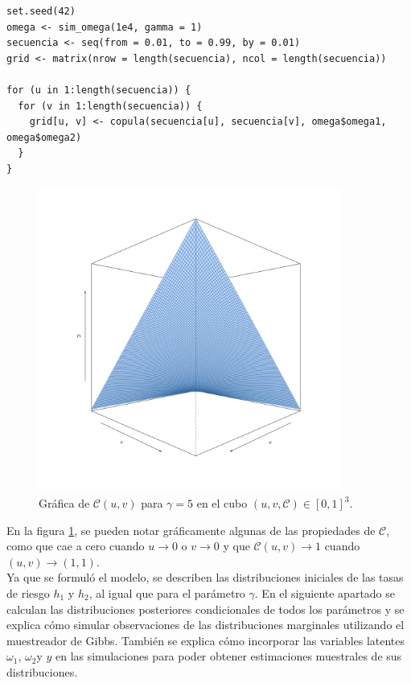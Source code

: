 \documentclass[11pt,a4paper]{article}
\begin{document}
\begin{lstlisting}
set.seed(42)
omega <- sim_omega(1e4, gamma = 1)
secuencia <- seq(from = 0.01, to = 0.99, by = 0.01)
grid <- matrix(nrow = length(secuencia), ncol = length(secuencia))

for (u in 1:length(secuencia)) {
  for (v in 1:length(secuencia)) {
    grid[u, v] <- copula(secuencia[u], secuencia[v], omega$omega1, omega$omega2)
  }
} 
\end{lstlisting}\leavevmode\newline

\begin{figure}[h]
\centering\includegraphics[width=10cm]{copula_5.png}
\caption{Gráfica de $\mathcal{C} (u, v)$ para $\gamma = 5$ en el cubo $(u, v, \mathcal{C}) \in [0, 1]^3$.}
\label{fig:copula}
\end{figure}

En la figura \ref{fig:copula}, se pueden notar gráficamente algunas de las propiedades de $\mathcal{C}$, como que cae a cero cuando $u \to 0$ o $v \to 0$ y que $\mathcal{C} (u, v) \to 1$ cuando $(u, v) \to (1, 1)$.\\

Ya que se formuló el modelo, se describen las distribuciones iniciales de las tasas de riesgo $h_1$ y $h_2$, al igual que para el parámetro $\gamma$. En el siguiente apartado se calculan las distribuciones posteriores condicionales de todos los parámetros y se explica cómo simular observaciones de las distribuciones marginales utilizando el muestreador de Gibbs. También se explica cómo incorporar las variables latentes $\omega_1$, $\omega_2$y $y$ en las simulaciones para poder obtener estimaciones muestrales de sus distribuciones.
\end{document}

